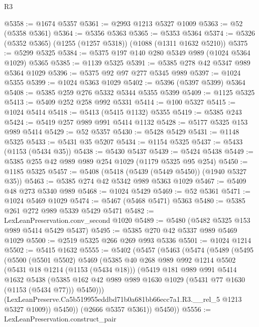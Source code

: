 \begin{lexlean}{R3}
\begin{coremodule}
@5358 := @1674 @5357
@5361 := @2993 @1213 @5327 @1009
@5363 := @52 (@5358 @5361)
@5364 := @5356 @5363
@5365 := @5353 @5364
@5374 := @5326 (@5352 @5365) (@1255 (@1257 @5318)) (@1088 (@1311 @1632 @5210))
@5375 := @5299 @5325
@5384 := @5375 @197 @140 @280 @5349 @989 (@1024 @5364 @1029) @5365
@5385 := @1139 @5325
@5391 := @5385 @278 @42 @5347 @989 @5364 @1029
@5396 := @5375 @92 @97 @277 @5345 @989
@5397 := @1024 @5355
@5399 := @1024 @5363 @1029
@5402 := @5396 (@5397 @5399) @5364
@5408 := @5385 @259 @276 @5332 @5344 @5355 @5399
@5409 := @1125 @5325
@5413 := @5409 @252 @258 @992 @5331
@5414 := @100 @5327
@5415 := @1024 @5414
@5418 := @5413 (@5415 @1132) @5355
@5419 := @5385 @243
@5424 := @5419 @257 @989 @991 @5414 @1132
@5428 := @5177 @5325 @153 @989 @5414
@5429 := @52 @5357
@5430 := @5428 @5429
@5431 := @1148 @5325
@5433 := @5431 @35 @5207
@5434 := @1154 @5325
@5437 := @5433 (@1153 (@5434 @35))
@5438 := @5430 @5437
@5439 := @5424 @5438
@5449 := @5385 @255 @42 @989 @989 @254 @1029 (@1179 @5325 @95 @254)
@5450 := @1185 @5325
@5457 := @5408 (@5418 (@5439 (@5449 @5450)) (@1940 @5327 @35))
@5463 := @5385 @274 @42 @5342 @989 @5363 @1029
@5467 := @5409 @48 @273 @5340 @989
@5468 := @1024 @5429
@5469 := @52 @5361
@5471 := @1024 @5469 @1029
@5474 := @5467 (@5468 @5471) @5363
@5480 := @5385 @261 @272 @989 @5339 @5429 @5471
@5482 := LexLeanPreservation.conv_second @1020
@5489 := @5480 (@5482 @5325 @153 @989 @5414 @5429 @5437)
@5495 := @5385 @270 @42 @5337 @989 @5469 @1029
@5500 := @2519 @5325 @266 @269 @993 @5336
@5501 := @1024 @1214
@5502 := @5415 @1632
@5555 := @5402
    (@5457
      (@5463
        (@5474
          (@5489
            (@5495
              (@5500
                (@5501 @5502)
                @5469
                (@5385
                  @40
                  @268
                  @989
                  @992
                  @1214
                  @5502
                  (@5431 @18 @1214 (@1153 (@5434 @18)))
                  (@5419
                    @181
                    @989
                    @991
                    @5414
                    @1632
                    @5438
                    (@5385
                      @162
                      @42
                      @989
                      @989
                      @1630
                      @1029
                      (@5431 @77 @1630 (@1153 (@5434 @77)))
                      @5450)))
                (LexLeanPreserve.Ca5b519955eddbd71b0a681bb66ecc7a1.R3.__rel_5 @1213 @5327 @1009))
              @5450))
          (@2666 @5357 @5361))
        @5450))
@5556 := LexLeanPreservation.construct_pair

\end{coremodule}
\end{lexlean}
